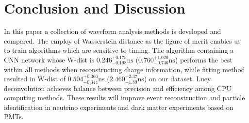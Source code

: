 \section{Conclusion and Discussion} %
In this paper a collection of waveform analysis methods is developed and compared. The employ of Wasserstein distance as the figure of merit enables us to train algorithms which are sensitive to timing. The algorithm containing a CNN network whose W-dist is $0.246^{+0.175}_{-0.198}\mathrm{ns}$ ($0.760^{+1.020}_{-0.746}\mathrm{ns}$) performs the best within all methods when reconstructing charge information, while fitting method resulted in W-dist of $0.504^{+0.366}_{-0.344}\mathrm{ns}$ ($2.460^{+2.37}_{-1.89}\mathrm{ns}$) on our dataset. Lucy deconvolution achieves balance between precision and efficiency among CPU computing methods. These results will improve event reconstruction and particle identification in neutrino experiments and dark matter experiments based on PMTs. 

